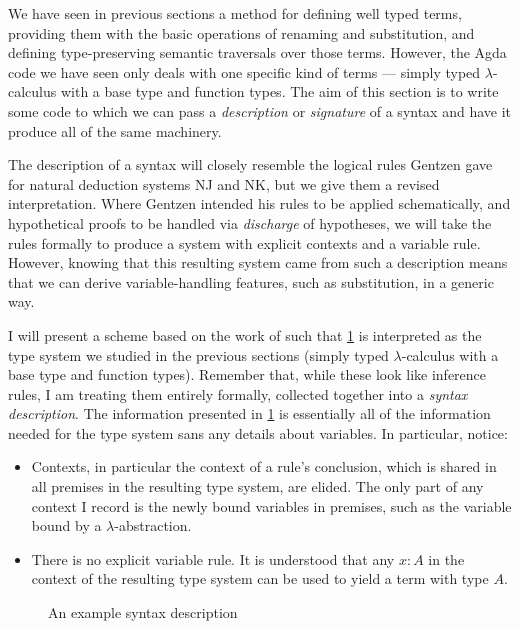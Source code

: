 We have seen in previous sections a method for defining well typed terms,
providing them with the basic operations of renaming and substitution, and
defining type-preserving semantic traversals over those terms.
However, the Agda code we have seen only deals with one specific kind of terms
--- simply typed $\lambda$-calculus with a base type and function types.
The aim of this section is to write some code to which we can pass a
\emph{description} or \emph{signature} of a syntax and have it produce all of
the same machinery.

The description of a syntax will closely resemble the logical rules Gentzen gave
for natural deduction systems NJ and NK, but we give them a revised
interpretation.
Where Gentzen intended his rules to be applied schematically, and hypothetical
proofs to be handled via \emph{discharge} of hypotheses, we will take the rules
formally to produce a system with explicit contexts and a variable rule.
However, knowing that this resulting system came from such a description means
that we can derive variable-handling features, such as substitution, in a
generic way.

I will present a scheme based on the work of \citet{AACMM21} such that
\cref{fig:app-lam} is interpreted as the type
system we studied in the previous sections (simply typed $\lambda$-calculus with
a base type and function types).
Remember that, while these look like inference rules, I am treating them
entirely formally, collected together into a \emph{syntax description}.
The information presented in \cref{fig:app-lam} is essentially all of the
information needed for the type system sans any details about variables.
In particular, notice:
\begin{itemize}
  \item Contexts, in particular the context of a rule's conclusion, which is
    shared in all premises in the resulting type system, are elided.
    The only part of any context I record is the newly bound variables in
    premises, such as the variable bound by a $\lambda$-abstraction.
  \item There is no explicit variable rule.
    It is understood that any $x : A$ in the context of the resulting type
    system can be used to yield a term with type $A$.
\end{itemize}

\begin{figure}
  \caption{An example syntax description}
  \label{fig:app-lam}
\end{figure}

